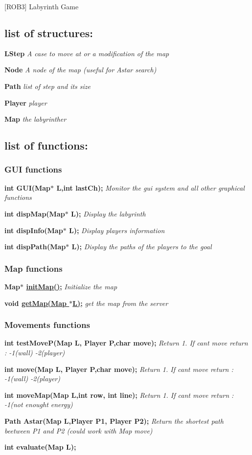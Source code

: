 \mbox{[}R\+O\+B3\mbox{]} Labyrinth Game

\subsection*{list of structures\+:}

{\bfseries L\+Step} {\itshape A case to move at or a modification of the map}

{\bfseries Node} {\itshape A node of the map (useful for Astar search)}

{\bfseries Path} {\itshape list of step and its size}

{\bfseries Player} {\itshape player}

{\bfseries Map} {\itshape the labyrinther}

\subsection*{list of functions\+:}

\subsubsection*{G\+UI functions}

{\bfseries int G\+U\+I(\+Map$\ast$ L,int last\+Ch);} {\itshape Monitor the gui system and all other graphical functions}

{\bfseries int disp\+Map(\+Map$\ast$ L);} {\itshape Display the labyrinth}

{\bfseries int disp\+Info(\+Map$\ast$ L);} {\itshape Display players\textquotesingle{} information}

{\bfseries int disp\+Path(\+Map$\ast$ L);} {\itshape Display the paths of the players to the goal}

\subsubsection*{Map functions}

{\bfseries Map$\ast$ \hyperlink{mapping_8h_af7560ce2af2a08abe0b230e7ba56cf45}{init\+Map()};} {\itshape Initialize the map}

{\bfseries void \hyperlink{mapping_8h_acd86842943223c3da418c5981befabf6}{get\+Map(\+Map $\ast$\+L)};} {\itshape get the map from the server} \subsubsection*{Movements functions}

{\bfseries int test\+Move\+P(\+Map L, Player P,char move);} {\itshape Return 1. If can\textquotesingle{}t move return \+: -\/1(wall) -\/2(player)}

{\bfseries int move(\+Map L, Player P,char move);} {\itshape Return 1. If can\textquotesingle{}t move return \+: -\/1(wall) -\/2(player)}

{\bfseries int move\+Map(\+Map L,int row, int line);} {\itshape Return 1. If can\textquotesingle{}t move return \+: -\/1(not enought energy)}

{\bfseries Path Astar(\+Map L,\+Player P1, Player P2);} {\itshape Return the shortest path beetween P1 and P2 (could work with Map move)}

{\bfseries int evaluate(\+Map L);} 